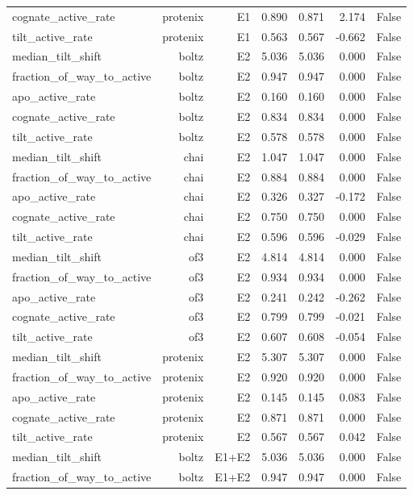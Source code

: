 \begin{longtable}{lrrrrrr}
cognate\_active\_rate & protenix & E1 & 0.890 & 0.871 & 2.174 & False \\
tilt\_active\_rate & protenix & E1 & 0.563 & 0.567 & -0.662 & False \\
median\_tilt\_shift & boltz & E2 & 5.036 & 5.036 & 0.000 & False \\
fraction\_of\_way\_to\_active & boltz & E2 & 0.947 & 0.947 & 0.000 & False \\
apo\_active\_rate & boltz & E2 & 0.160 & 0.160 & 0.000 & False \\
cognate\_active\_rate & boltz & E2 & 0.834 & 0.834 & 0.000 & False \\
tilt\_active\_rate & boltz & E2 & 0.578 & 0.578 & 0.000 & False \\
median\_tilt\_shift & chai & E2 & 1.047 & 1.047 & 0.000 & False \\
fraction\_of\_way\_to\_active & chai & E2 & 0.884 & 0.884 & 0.000 & False \\
apo\_active\_rate & chai & E2 & 0.326 & 0.327 & -0.172 & False \\
cognate\_active\_rate & chai & E2 & 0.750 & 0.750 & 0.000 & False \\
tilt\_active\_rate & chai & E2 & 0.596 & 0.596 & -0.029 & False \\
median\_tilt\_shift & of3 & E2 & 4.814 & 4.814 & 0.000 & False \\
fraction\_of\_way\_to\_active & of3 & E2 & 0.934 & 0.934 & 0.000 & False \\
apo\_active\_rate & of3 & E2 & 0.241 & 0.242 & -0.262 & False \\
cognate\_active\_rate & of3 & E2 & 0.799 & 0.799 & -0.021 & False \\
tilt\_active\_rate & of3 & E2 & 0.607 & 0.608 & -0.054 & False \\
median\_tilt\_shift & protenix & E2 & 5.307 & 5.307 & 0.000 & False \\
fraction\_of\_way\_to\_active & protenix & E2 & 0.920 & 0.920 & 0.000 & False \\
apo\_active\_rate & protenix & E2 & 0.145 & 0.145 & 0.083 & False \\
cognate\_active\_rate & protenix & E2 & 0.871 & 0.871 & 0.000 & False \\
tilt\_active\_rate & protenix & E2 & 0.567 & 0.567 & 0.042 & False \\
median\_tilt\_shift & boltz & E1+E2 & 5.036 & 5.036 & 0.000 & False \\
fraction\_of\_way\_to\_active & boltz & E1+E2 & 0.947 & 0.947 & 0.000 & False \\

\end{longtable}
